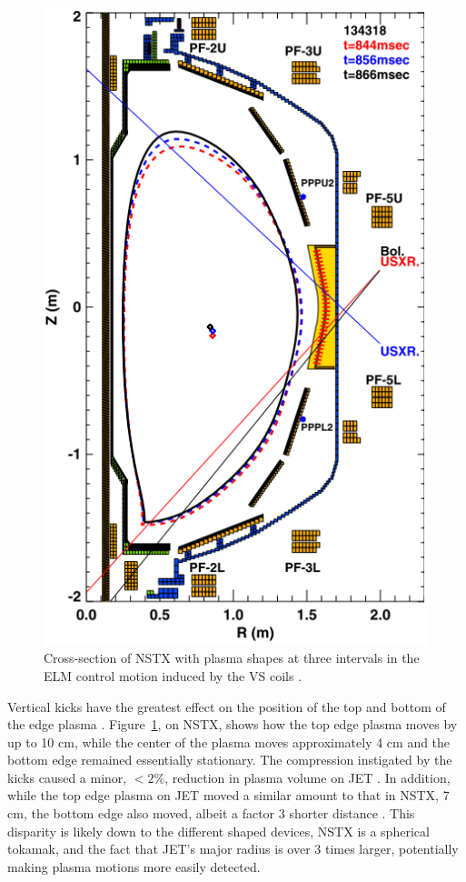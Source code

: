 \documentclass[11pt, twocolumn]{article}  %
\begin{document}
\begin{figure}
\includegraphics[scale=0.5]{Figures/VKshape.PNG}
\centering
\caption{Cross-section of NSTX with plasma shapes at three intervals in the ELM control motion induced by the VS coils \cite{Gerhardt2010}.}\label{fig:VKshape}
\end{figure}

Vertical kicks have the greatest effect on the position of the top and bottom of the edge plasma \cite{Gerhardt2010}. Figure~\ref{fig:VKshape}, on NSTX, shows how the top edge plasma moves by up to 10 cm, while the center of the plasma moves approximately 4 cm and the bottom edge remained essentially stationary. The compression instigated by the kicks caused a minor, $< 2\%$, reduction in plasma volume on JET \cite{DelaLuna2016}. In addition, while the top edge plasma on JET moved a similar amount to that in NSTX, 7 cm, the bottom edge also moved, albeit a factor 3 shorter distance \cite{DelaLuna2016}. This disparity is likely down to the different shaped devices, NSTX is a spherical tokamak, and the fact that JET's major radius is over 3 times larger, potentially making plasma motions more easily detected.
\end{document}
